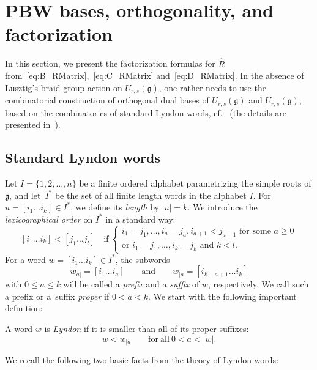 \documentclass[pdftex]{sigma}
\numberwithin{equation}{section}
\newcommand{\fg}{\mathfrak{g}}
\newcommand{\uu}{U_{r,s}(\fg)}
\begin{document}
\section{PBW bases, orthogonality, and factorization}\label{sec:R-factorized}

In this section, we present the factorization formulas for $\hat{R}$ from~\eqref{eq:B_RMatrix},~\eqref{eq:C_RMatrix} and~\eqref{eq:D_RMatrix}. In the absence of Lusztig's braid group action on $\uu$, one rather needs to use the combinatorial construction of orthogonal dual bases of $U^+_{r,s}(\fg)$ and $U^-_{r,s}(\fg)$, based on the combinatorics of standard Lyndon words, cf.\ \cite{K1,K2,L,Ro} (the details are presented in~\cite{MT1,MT2}).

\subsection{Standard Lyndon words}\label{ssec:Lyndon}

Let $I=\{1, 2, \dots, n\}$ be a finite ordered alphabet parametrizing the simple roots of $\fg$, and let~$I^*$ be the set of all finite length words in the alphabet $I$. For $u=[i_1 \dots i_k]\in I^*$, we define its \emph{length} by $|u|=k$. We introduce the \emph{lexicographical order} on $I^*$ in a standard way:
\[
 [i_1 \dots i_k] < [j_1 \dots j_l]
\quad \text{if}\ \begin{cases}
\text{$i_1=j_1, \dots, i_a=j_a, i_{a+1} < j_{a+1}$ for some $a \geq 0$}\\
\text{or $i_1=j_1, \dots, i_k=j_k$ and $k < l$}.
\end{cases}
\]
For a word $w = [i_1 \dots i_k]\in I^*$, the subwords
\begin{displaymath}
 w_{a|} = [i_1 \dots i_a] \qquad \text{and} \qquad w_{|a} = [i_{k-a+1} \dots i_k]
\end{displaymath}
with $0\leq a\leq k$ will be called a \emph{prefix} and a \emph{suffix} of $w$, respectively.
We call such a prefix or a~suffix \emph{proper} if $0<a<k$. We start with the following important definition:

\begin{Definition}%
A word $w$ is \textit{Lyndon} if it is smaller than all of its proper suffixes:
\begin{displaymath}
 w < w_{|a} \qquad \mathrm{for\ all} \ 0<a<|w|.
\end{displaymath}
\end{Definition}

We recall the following two basic facts from the theory of Lyndon words:
\end{document}

